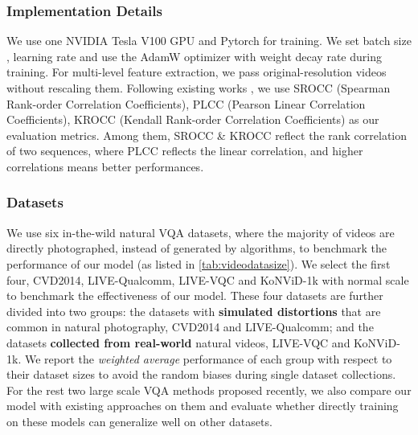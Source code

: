 \documentclass[journal]{IEEEtran}
\begin{document}
\subsubsection{Implementation Details}
We use one NVIDIA Tesla V100 GPU and Pytorch \cite{pytorch} for training. We set batch size , learning rate  and use the AdamW \cite{adamw} optimizer with  weight decay rate during training. For multi-level feature extraction, we pass original-resolution videos without rescaling them.
Following existing works \cite{vsfa, mdtvsfa, videval, vbliinds}, we use SROCC (Spearman Rank-order Correlation Coefficients), PLCC (Pearson Linear Correlation Coefficients), KROCC (Kendall Rank-order Correlation Coefficients) as our evaluation metrics.
Among them, SROCC \& KROCC reflect the rank correlation of two sequences, where PLCC reflects the linear correlation, and higher correlations means better performances.

\subsubsection{Datasets}
We use six in-the-wild natural VQA datasets, where the majority of videos are directly photographed, instead of generated by algorithms, to benchmark the performance of our model (as listed in \cref{tab:videodatasize}). We select the first four, CVD2014, LIVE-Qualcomm, LIVE-VQC and KoNViD-1k with normal scale to benchmark the effectiveness of our model. These four datasets are further divided into two groups: the datasets with \textbf{simulated distortions} that are common in natural photography, CVD2014 and LIVE-Qualcomm; and the datasets \textbf{collected from real-world} natural videos, LIVE-VQC and KoNViD-1k. We report the \textit{weighted average} performance of each group with respect to their dataset sizes to avoid the random biases during single dataset collections. For the rest two large scale VQA methods proposed recently, we also compare our model with existing approaches on them and evaluate whether directly training on these models can generalize well on other datasets. 
\end{document}
